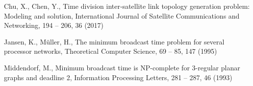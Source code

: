 \begin{thebibliography}{}
%
%
Chu, X., Chen, Y.,
Time division inter‐satellite link topology generation problem: Modeling and solution,
International Journal of Satellite Communications and Networking, 194 -- 206, 36 (2017)

Jansen, K., M\"uller, H.,
The minimum broadcast time problem for several processor networks, 
Theoretical Computer Science, 69 -- 85, 147 (1995)

Middendorf, M.,
Minimum broadcast time is NP-complete for 3-regular planar graphs and deadline 2,
Information Processing Letters, 281 -- 287, 46 (1993)

\end{thebibliography}



